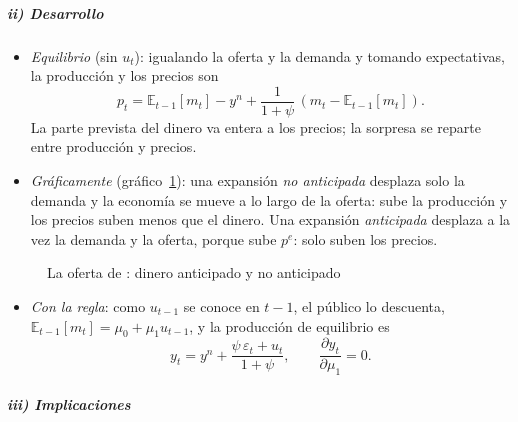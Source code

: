 \documentclass[11pt]{article}
\begin{document}
\subparagraph{ii) Desarrollo}

\begin{itemize}
\item \emph{Equilibrio} (sin $u_t$): igualando la oferta y la demanda y tomando expectativas, la producción y los precios son
  \begin{equation}\label{eq:precios-lucas}
  p_t=\mathbb{E}_{t-1}[m_t]-y^n+\frac{1}{1+\psi}\,\left(m_t-\mathbb{E}_{t-1}[m_t]\right).
  \end{equation}
  La parte prevista del dinero va entera a los precios; la sorpresa se reparte entre producción y precios.
\item \emph{Gráficamente} (gráfico~\ref{fig:oferta-lucas}): una expansión \emph{no anticipada} desplaza solo la demanda y la economía se mueve a lo largo de la oferta: sube la producción y los precios suben menos que el dinero. Una expansión \emph{anticipada} desplaza a la vez la demanda y la oferta, porque sube $p^e$: solo suben los precios.
\end{itemize}

\begin{figure}[H]
\centering
\caption{La oferta de : dinero anticipado y no anticipado}\label{fig:oferta-lucas}
\end{figure}

\begin{itemize}
\item \emph{Con la regla}: como $u_{t-1}$ se conoce en $t-1$, el público lo descuenta, $\mathbb{E}_{t-1}[m_t]=\mu_0+\mu_1u_{t-1}$, y la producción de equilibrio es
  \begin{equation}\label{eq:inefectividad}
  y_t=y^n+\frac{\psi\,\varepsilon_t+u_t}{1+\psi},\qquad \frac{\partial y_t}{\partial\mu_1}=0 .
  \end{equation}
\end{itemize}

\subparagraph{iii) Implicaciones}
\end{document}
